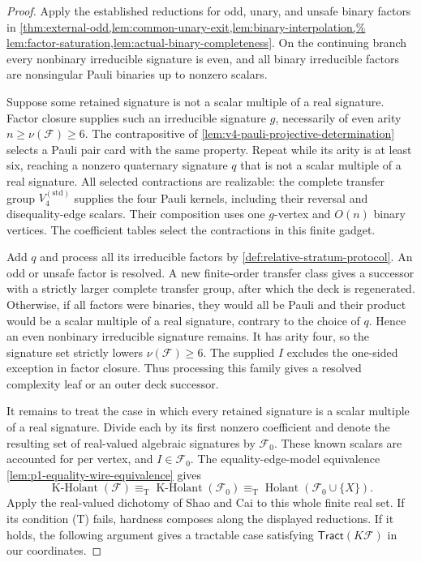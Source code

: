 \documentclass[11pt,letterpaper,onecolumn]{article}
\theoremstyle{plain}
\theoremstyle{definition}
\theoremstyle{remark}
\newcommand{\cF}{\mathcal F}
\newcommand{\Holant}{\operatorname{Holant}}
\newcommand{\KHolant}{\operatorname{K\text{-}Holant}}
\newcommand{\Tract}{\mathsf{Tract}}
\newcommand{\KleinStd}{{V_4^{(\mathrm{std})}}}
\newcommand{\equivT}{\equiv_{\mathrm T}}
\begin{document}
\begin{proof}
Apply the established reductions for odd, unary, and unsafe binary factors in
\cref{thm:external-odd,lem:common-unary-exit,lem:binary-interpolation,%
lem:factor-saturation,lem:actual-binary-completeness}.
On the continuing branch every nonbinary irreducible signature is even, and all binary
irreducible factors are nonsingular Pauli binaries up to nonzero scalars.

Suppose some retained signature is not a scalar multiple of a real signature.
Factor closure supplies such an irreducible signature \(g\), necessarily
of even arity \(n\ge\nu(\cF)\ge6\).  The contrapositive of
\cref{lem:v4-pauli-projective-determination} selects a Pauli pair card
with the same property.  Repeat while its arity is at least six, reaching
a nonzero quaternary signature \(q\) that is not a scalar multiple of a real signature.
All selected contractions are realizable: the complete transfer group \(\KleinStd\) supplies the four
Pauli kernels, including their reversal and disequality-edge scalars.  Their
composition uses one \(g\)-vertex and \(O(n)\) binary vertices.  The
coefficient tables select the contractions in this finite gadget.

Add \(q\) and process all its irreducible factors by
\cref{def:relative-stratum-protocol}.  An odd or unsafe factor is resolved.
A new finite-order transfer class gives a successor with a strictly
larger complete transfer group, after which the deck is regenerated.  Otherwise, if all factors were binaries, they would all be
Pauli and their product would be a scalar multiple of a real signature, contrary to
the choice of \(q\).  Hence an even nonbinary irreducible signature remains.  It has
arity four, so the signature set strictly lowers
\(\nu(\cF)\ge6\).  The supplied \(I\) excludes the one-sided exception
in factor closure.  Thus processing this family gives a resolved complexity leaf or an
outer deck successor.

It remains to treat the case in which every retained signature is a
scalar multiple of a real signature. Divide each by its first nonzero
coefficient and denote the resulting set of real-valued algebraic
signatures by \(\cF_0\).  These known
scalars are accounted for per vertex, and \(I\in\cF_0\).  The
equality-edge-model equivalence \cref{lem:p1-equality-wire-equivalence} gives
\[
 \KHolant(\cF)\equivT\KHolant(\cF_0)
 \equivT\Holant(\cF_0\cup\{X\}).
\]
Apply the real-valued dichotomy of Shao and Cai
\cite[full version, Theorems~1.2 and~2.22]{ShaoCai2020} to this whole
finite real set.  If its condition \textnormal{(T)} fails, hardness
composes along the displayed reductions.  If it holds, the following
argument gives a tractable case satisfying \(\Tract(K\cF)\) in our
coordinates.


\end{proof}
\end{document}
